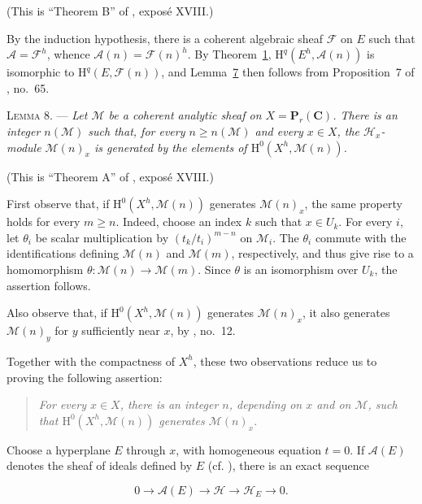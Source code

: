 (This is ``Theorem B'' of , exposé XVIII.)

By the induction hypothesis, there is a coherent algebraic sheaf $\mathcal{F}$ on $E$ such that $\mathcal{A}=\mathcal{F}^h$, whence $\mathcal{A}(n)=\mathcal{F}(n)^h$. By Theorem~\hyperref[gaga:thm:1]{1}, $\mathrm{H}^q(E^h,\mathcal{A}(n))$ is isomorphic to $\mathrm{H}^q(E,\mathcal{F}(n))$, and Lemma~\hyperref[gaga:lemma:7]{7} then follows from Proposition~7 of , no.~65.

\textsc{Lemma 8}. --- \emph{Let $\mathcal{M}$ be a coherent analytic sheaf on $X=\mathbf{P}_r(\mathbf{C})$. There is an integer $n(\mathcal{M})$ such that, for every $n\geqslant n(\mathcal{M})$ and every $x\in X$, the $\mathcal{H}_x$-module $\mathcal{M}(n)_x$ is generated by the elements of $\mathrm{H}^0(X^h,\mathcal{M}(n))$.}

(This is ``Theorem A'' of , exposé XVIII.)

First observe that, if $\mathrm{H}^0(X^h,\mathcal{M}(n))$ generates $\mathcal{M}(n)_x$, the same property holds for every $m\geqslant n$. Indeed, choose an index $k$ such that $x\in U_k$. For every $i$, let $\theta_i$ be scalar multiplication by $(t_k/t_i)^{m-n}$ on $\mathcal{M}_i$. The $\theta_i$ commute with the identifications defining $\mathcal{M}(n)$ and $\mathcal{M}(m)$, respectively, and thus give rise to a homomorphism $\theta:\mathcal{M}(n)\to\mathcal{M}(m)$. Since $\theta$ is an isomorphism over $U_k$, the assertion follows.

Also observe that, if $\mathrm{H}^0(X^h,\mathcal{M}(n))$ generates $\mathcal{M}(n)_x$, it also generates $\mathcal{M}(n)_y$ for $y$ sufficiently near $x$, by , no.~12.

Together with the compactness of $X^h$, these two observations reduce us to proving the following assertion:

\begin{quote}
\emph{For every $x\in X$, there is an integer $n$, depending on $x$ and on $\mathcal{M}$, such that $\mathrm{H}^0(X^h,\mathcal{M}(n))$ generates $\mathcal{M}(n)_x$.}
\end{quote}

Choose a hyperplane $E$ through $x$, with homogeneous equation $t=0$. If $\mathcal{A}(E)$ denotes the sheaf of ideals defined by $E$ (cf. ), there is an exact sequence

\begin{equation*}
0\longrightarrow\mathcal{A}(E)\longrightarrow\mathcal{H}
\longrightarrow\mathcal{H}_E\longrightarrow0.
\end{equation*}

